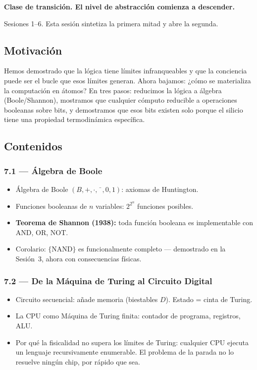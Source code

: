 \documentclass[11pt, letterpaper]{article}
\begin{document}
\textcolor{mitred}{\textbf{Clase de transici\'on. El nivel de abstracci\'on comienza a descender.}}

\begin{prereqs}
Sesiones 1--6. Esta sesi\'on sintetiza la primera mitad y abre la segunda.
\end{prereqs}

\subsection*{Motivaci\'on}
Hemos demostrado que la l\'ogica tiene l\'imites infranqueables y que la conciencia puede ser el bucle que esos l\'imites generan. Ahora bajamos: ¿c\'omo se materializa la computaci\'on en \'atomos? En tres pasos: reducimos la l\'ogica a \'algebra (Boole/Shannon), mostramos que cualquier c\'omputo reducible a operaciones booleanas sobre bits, y demostramos que esos bits existen solo porque el silicio tiene una propiedad termodin\'amica espec\'ifica.

\subsection{Contenidos}

\subsubsection{7.1 --- \'Algebra de Boole}
\begin{itemize}
  \item \'Algebra de Boole $(B,+,\cdot,\bar{\phantom{x}},0,1)$: axiomas de Huntington.
  \item Funciones booleanas de $n$ variables: $2^{2^n}$ funciones posibles.
  \item \textbf{Teorema de Shannon (1938):} toda funci\'on booleana es implementable con AND, OR, NOT.
  \item Corolario: $\{\text{NAND}\}$ es funcionalmente completo --- demostrado en la Sesi\'on~3, ahora con consecuencias f\'isicas.
\end{itemize}

\subsubsection{7.2 --- De la M\'aquina de Turing al Circuito Digital}
\begin{itemize}
  \item Circuito secuencial: a\~nade memoria (biestables $D$). Estado = cinta de Turing.
  \item La CPU como M\'aquina de Turing finita: contador de programa, registros, ALU.
  \item Por qu\'e la fisicalidad no supera los l\'imites de Turing: cualquier CPU ejecuta un lenguaje recursivamente enumerable. El problema de la parada no lo resuelve ning\'un chip, por r\'apido que sea.
\end{itemize}
\end{document}
